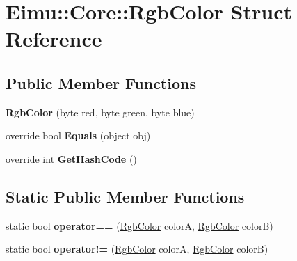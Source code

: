 \hypertarget{struct_eimu_1_1_core_1_1_rgb_color}{
\section{Eimu::Core::RgbColor Struct Reference}
\label{struct_eimu_1_1_core_1_1_rgb_color}
}
\subsection*{Public Member Functions}
\begin{DoxyCompactItemize}
\item 
\hypertarget{struct_eimu_1_1_core_1_1_rgb_color_a660b42bab745722fe27e45efc65f3b33}{
{\bfseries RgbColor} (byte red, byte green, byte blue)}
\label{struct_eimu_1_1_core_1_1_rgb_color_a660b42bab745722fe27e45efc65f3b33}

\item 
\hypertarget{struct_eimu_1_1_core_1_1_rgb_color_ac2a0ba8c562ce9a834d0cb6e211676e3}{
override bool {\bfseries Equals} (object obj)}
\label{struct_eimu_1_1_core_1_1_rgb_color_ac2a0ba8c562ce9a834d0cb6e211676e3}

\item 
\hypertarget{struct_eimu_1_1_core_1_1_rgb_color_ac9369123b643b37c60ab7d73bb23fa35}{
override int {\bfseries GetHashCode} ()}
\label{struct_eimu_1_1_core_1_1_rgb_color_ac9369123b643b37c60ab7d73bb23fa35}

\end{DoxyCompactItemize}
\subsection*{Static Public Member Functions}
\begin{DoxyCompactItemize}
\item 
\hypertarget{struct_eimu_1_1_core_1_1_rgb_color_a75649c2ba17907e1bfd83a86dbe68a98}{
static bool {\bfseries operator==} (\hyperlink{struct_eimu_1_1_core_1_1_rgb_color}{RgbColor} colorA, \hyperlink{struct_eimu_1_1_core_1_1_rgb_color}{RgbColor} colorB)}
\label{struct_eimu_1_1_core_1_1_rgb_color_a75649c2ba17907e1bfd83a86dbe68a98}

\item 
\hypertarget{struct_eimu_1_1_core_1_1_rgb_color_a51ef152c58c2731886bf53e31bde0554}{
static bool {\bfseries operator!=} (\hyperlink{struct_eimu_1_1_core_1_1_rgb_color}{RgbColor} colorA, \hyperlink{struct_eimu_1_1_core_1_1_rgb_color}{RgbColor} colorB)}
\label{struct_eimu_1_1_core_1_1_rgb_color_a51ef152c58c2731886bf53e31bde0554}

\end{DoxyCompactItemize}
